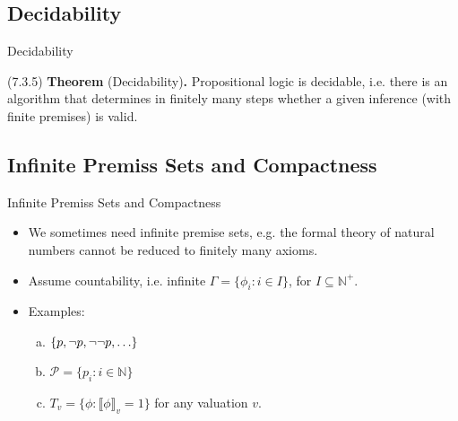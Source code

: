\subsection{Decidability}
\begin{frame}{Decidability}
	
	(7.3.5) \textbf{Theorem} (Decidability)\textbf{.}
	Propositional logic is decidable, i.e. there is an algorithm that determines in finitely many steps whether a given inference (with finite premises) is valid.

\end{frame}

\subsection{Infinite Premiss Sets and Compactness}

\begin{frame}{Infinite Premiss Sets and Compactness}

\begin{itemize}
\itemsep=16pt

	
		\item We sometimes need infinite premise sets, e.g. the formal theory of natural numbers cannot be reduced to finitely many axioms.
				
		\item Assume countability, i.e. infinite $\Gamma=\{\phi_i:i\in I\}$, for $I\subseteq\mathbb{N}^+$.
		
		\item Examples:
		
			\begin{enumerate}[(a)]
		
			\item $\{p, \neg p, \neg\neg p, \mathellipsis\}$		
			
			\item $\mathcal{P}=\{p_i: i\in \mathbb{N}\}$
			
			\item $T_v=\{\phi:\llbracket\phi\rrbracket_v=1\}$ for any valuation $v$.
					
		\end{enumerate}
			
	\end{itemize}

\end{frame}

